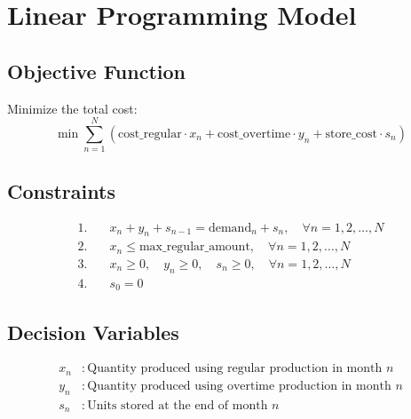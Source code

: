 \documentclass{article}
\begin{document}
\section*{Linear Programming Model}

\subsection*{Objective Function}
Minimize the total cost:
\[
\min \sum_{n=1}^{N} \left( \text{cost\_regular} \cdot x_n + \text{cost\_overtime} \cdot y_n + \text{store\_cost} \cdot s_n \right)
\]

\subsection*{Constraints}
\begin{align*}
1. & \quad x_n + y_n + s_{n-1} = \text{demand}_{n} + s_n, \quad \forall n = 1, 2, \ldots, N\\
2. & \quad x_n \leq \text{max\_regular\_amount}, \quad \forall n = 1, 2, \ldots, N\\
3. & \quad x_n \geq 0, \quad y_n \geq 0, \quad s_n \geq 0, \quad \forall n = 1, 2, \ldots, N\\
4. & \quad s_0 = 0
\end{align*}

\subsection*{Decision Variables}
\begin{align*}
x_n & : \text{Quantity produced using regular production in month } n\\
y_n & : \text{Quantity produced using overtime production in month } n\\
s_n & : \text{Units stored at the end of month } n
\end{align*}
\end{document}
